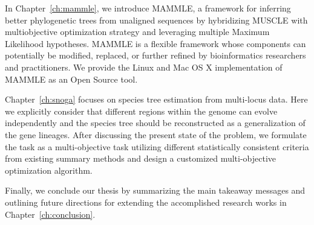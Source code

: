 In Chapter~\ref{ch:mammle}, we introduce MAMMLE, a framework for inferring better phylogenetic trees from unaligned sequences by hybridizing MUSCLE with multiobjective optimization strategy and leveraging multiple Maximum Likelihood hypotheses. MAMMLE is a flexible framework whose components can potentially be modified, replaced, or further refined by bioinformatics researchers and practitioners. We provide the Linux and Mac OS X implementation of MAMMLE as an Open Source tool.


Chapter~\ref{ch:snoga} focuses on species tree estimation from multi-locus data. Here we explicitly consider that different regions within the genome can evolve independently and the species tree should be reconstructed as a generalization of the gene lineages. After discussing the present state of the problem, we formulate the task as a multi-objective task utilizing different statistically consistent criteria from existing summary methods and design a customized multi-objective optimization algorithm.


Finally, we conclude our thesis by summarizing the main takeaway messages and outlining future directions for extending the accomplished research works in Chapter~\ref{ch:conclusion}.

\begin{comment}

By accomplishing our objectives mentioned above we expect to obtain the following outcomes.

(i) A systematic methodology for choosing an appropriate multi-objective formulation of MSA considering the application domain (i.e., in our case phylogeny estimation). [Aim A, C]

(ii) Several phylogeny-aware multi-objective formulations of MSA. [Aim A, C]

(iii) Some robust methods for alignment-based phylogeny estimation stemming from the hybridization of state-of-the-art iterative MSA methods and many-objective optimization strategies. [Aim A-C]

(iv) Some customized multi-objective optimization algorithms for species tree estimation by summarizing a set of given gene trees. [Aim B, C]

(v) As a by-product of the above outcome, new MO frameworks may be proposed that could be of independent interest. [Aim C]

(vi) Open-source software tools for estimating phylogenetic trees from MSAs using our proposed approaches. [Aim B]

(vii) A scientific discourse along with a comparative analysis on the overall efficacy of the concept of domain-specific measures in general and phylogeny-awareness in particular. [Aim A]
\end{comment}